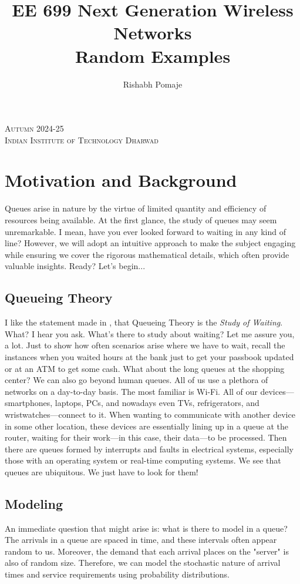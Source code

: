 \documentclass[11pt, a4paper]{report}
\title{\Huge{EE 699 Next Generation Wireless Networks}\\ Random Examples}
\author{\huge{Rishabh Pomaje}}
\date{}
\begin{document}
\titleBC
\begin{center}
\textsc{\Large Autumn 2024-25\\[0.3cm] Indian Institute of Technology Dharwad}
\end{center}
\vspace*{\fill}


\newpage%

\tableofcontents
\pagebreak

\chapter{Motivation and Background}
Queues arise in nature by the virtue of limited quantity and efficiency of resources being available. At the first glance, the study of queues may seem unremarkable. I mean, have you ever looked forward to waiting in any kind of line? However, we will adopt an intuitive approach to make the subject engaging while ensuring we cover the rigorous mathematical details, which often provide valuable insights. Ready? Let's begin...

\section{Queueing Theory}

I like the statement made in \cite{RobertazziQ}, that Queueing Theory is the \emph{Study of Waiting}. What? I hear you ask. What's there to study about waiting? Let me assure you, a lot. Just to show how often scenarios arise where we have to wait, recall the instances when you waited hours at the bank just to get your passbook updated or at an ATM to get some cash. What about the long queues at the shopping center? We can also go beyond human queues. All of us use a plethora of networks on a day-to-day basis. The most familiar is Wi-Fi. All of our devices—smartphones, laptops, PCs, and nowadays even TVs, refrigerators, and wristwatches—connect to it. When wanting to communicate with another device in some other location, these devices are essentially lining up in a queue at the router, waiting for their work—in this case, their data—to be processed. Then there are queues formed by interrupts and faults in electrical systems, especially those with an operating system or real-time computing systems. We see that queues are ubiquitous. We just have to look for them!  

\section{Modeling}
An immediate question that might arise is: what is there to model in a queue? The arrivals in a queue are spaced in time, and these intervals often appear random to us. Moreover, the demand that each arrival places on the "server" is also of random size. Therefore, we can model the stochastic nature of arrival times and service requirements using probability distributions.
\end{document}
